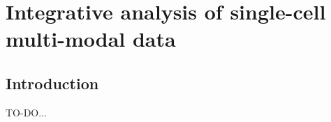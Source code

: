 \chapter{Integrative analysis of single-cell multi-modal data}

\section{Introduction}
TO-DO...






